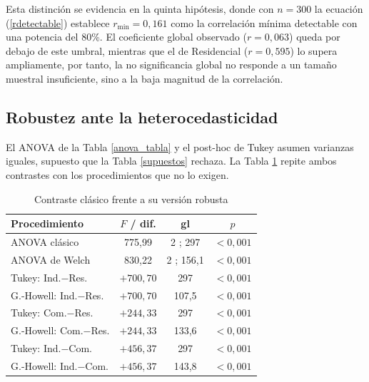         Esta distinción se evidencia en la quinta hipótesis, donde con
        $n=300$ la ecuación (\ref{rdetectable}) establece $r_{\min}=0{,}161$
        como la correlación mínima detectable con una potencia del 80\%. El
        coeficiente global observado ($r=0,063$) queda por debajo de este umbral,
        mientras que el de Residencial ($r=0,595$) lo supera ampliamente, por
        tanto, la no significancia global no responde a un tamaño muestral
        insuficiente, sino a la baja magnitud de la correlación.

    \subsection{Robustez ante la heterocedasticidad}
        \label{subsec_robustez_resultados}
        El ANOVA de la Tabla \ref{anova_tabla} y el post-hoc de Tukey asumen
        varianzas iguales, supuesto que la Tabla \ref{supuestos} rechaza. La
        Tabla \ref{robustez} repite ambos contrastes con los procedimientos que
        no lo exigen.

        \begin{table}[H]
            \centering
            \caption{Contraste clásico frente a su versión robusta}
            \begin{center}
                \begin{tabular}{|l|c|c|c|}
                    \hline
                    \textbf{Procedimiento} & \textbf{$F$ / dif.} &
                    \textbf{gl} & \textbf{$p$} \\
                    \hline
                    ANOVA clásico & 775,99 & 2 ; 297 & $<0{,}001$ \\
                    \hline
                    ANOVA de Welch & 830,22 & 2 ; 156,1 & $<0{,}001$ \\
                    \hline
                    Tukey: Ind.$-$Res. & $+700{,}70$ & 297 & $<0{,}001$ \\
                    \hline
                    G.-Howell: Ind.$-$Res. & $+700{,}70$ & 107,5 & $<0{,}001$ \\
                    \hline
                    Tukey: Com.$-$Res. & $+244{,}33$ & 297 & $<0{,}001$ \\
                    \hline
                    G.-Howell: Com.$-$Res. & $+244{,}33$ & 133,6 & $<0{,}001$ \\
                    \hline
                    Tukey: Ind.$-$Com. & $+456{,}37$ & 297 & $<0{,}001$ \\
                    \hline
                    G.-Howell: Ind.$-$Com. & $+456{,}37$ & 143,8 & $<0{,}001$ \\
                    \hline
                \end{tabular}
                \label{robustez}
            \end{center}
        \end{table}

